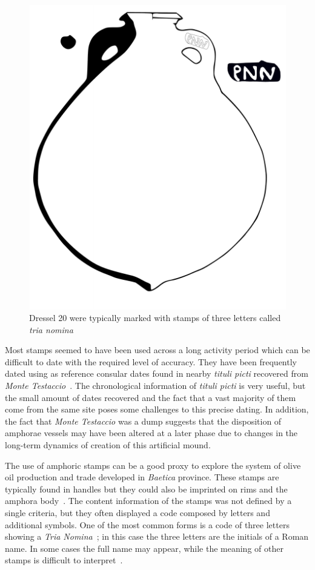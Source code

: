 \begin{figure}[htp]
	\centering
\includegraphics[scale=0.5]{dressel20}
\caption{Dressel 20 were typically marked with stamps of three letters called \textit{tria nomina}}
\label{amphora}
\end{figure} 

Most stamps seemed to have been used across a long activity period which can be difficult to date with the required level of accuracy. They have been frequently dated using as reference consular dates found in nearby \textit{tituli picti} recovered from \textit{Monte Testaccio}~\citep{Testaccio1, berni_millet_epigrafianforica_2008}.
The chronological information of \textit{tituli picti} is very useful, but the small amount of dates recovered and the fact that a vast majority of them come from the same site poses some challenges to this precise dating. In addition, the fact that \textit{Monte Testaccio} was a dump suggests that the disposition of amphorae vessels may have been altered at a later phase due to changes in the long-term dynamics of creation of this artificial mound.

The use of amphoric stamps can be a good proxy to explore the system of olive oil production and trade developed in \textit{Baetica} province. These stamps are typically found in handles but they could also be imprinted on rims and the amphora body~\citep{millet_anforas_1998}. The content information of the stamps was not defined by a single criteria, but they often displayed a code composed by letters and additional symbols. One of the most common forms is a code of three letters showing a \textit{Tria Nomina}~\citep{berni_millet_amphora_1996}; in this case the three letters are the initials of a Roman name. In some cases the full name may appear, while the meaning of other stamps is difficult to interpret~\citep{rodriguez_baetican_1998}. 

